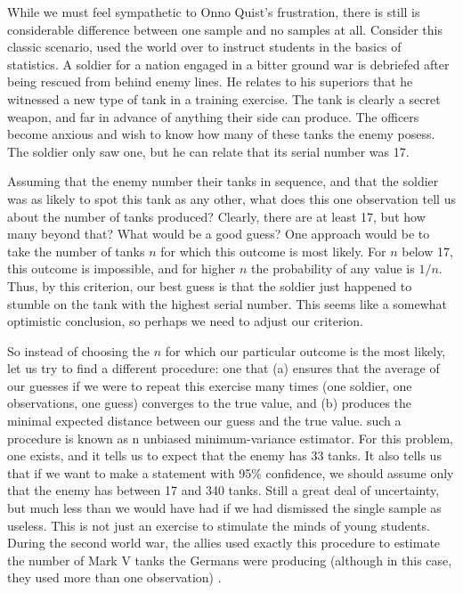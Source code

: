  \index{$5\sigma$} 

While we must feel sympathetic to Onno Quist's frustration, there is still is considerable difference between one sample and no samples at all. Consider this classic scenario, used the world over to instruct students in the basics of statistics. A soldier for a nation engaged in a bitter ground war is debriefed after being rescued from behind enemy lines. He relates to his superiors that he witnessed a new type of tank in a training exercise. The tank is clearly a secret weapon, and far in advance of anything their side can produce. The officers become anxious and wish to know how many of these tanks the enemy posess. The soldier only saw one, but he can relate that its serial number was 17.


Assuming that the enemy number their tanks in sequence, and that the soldier was as likely to spot this tank as any other, what does this one observation tell us about the number of tanks produced? Clearly, there are at least 17, but how many beyond that? What would be a good guess? One approach would be to take the number of tanks $n$ for which this outcome is most likely. For $n$ below 17, this outcome is impossible, and for higher $n$ the probability of any value is $1/n$. Thus, by this criterion, our best guess is that the soldier just happened to stumble on the tank with the highest serial number. This seems like a somewhat optimistic conclusion, so perhaps we need to adjust our criterion.

So instead of choosing the $n$ for which our particular outcome is the most likely, let us try to find a different procedure: one that (a) ensures that the average of our guesses if we were to repeat this exercise many times (one soldier, one observations, one guess) converges to the true value, and (b) produces the minimal expected distance between our guess and the true value. such a procedure is known as n unbiased minimum-variance estimator. For this problem, one exists, and it tells us to expect that the enemy has 33 tanks. It also tells us that if we want to make a statement with 95\% confidence, we should assume only that the enemy has between 17 and 340 tanks. Still a great deal of uncertainty, but much less than we would have had if we had dismissed the single sample as useless. This is not just an exercise to stimulate the minds of young students. During the second world war, the allies used exactly this procedure to estimate the number of Mark V tanks the Germans were producing (although in this case, they used more than one observation) \cite{davies2006statistical}.

